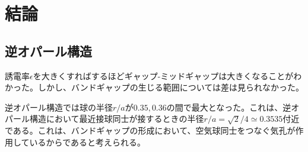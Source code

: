 \documentclass[platex,dvipdfmx]{jsreport}
\numberwithin{equation}{section}
\begin{document}
\chapter{結論}

\section{逆オパール構造}
誘電率$\epsilon$を大きくすればするほどギャップ-ミッドギャップは大きくなることがわかった。しかし、バンドギャップの生じる範囲については差は見られなかった。

逆オパール構造では球の半径$r / a$が$0.35, 0.36$の間で最大となった。これは、逆オパール構造において最近接球同士が接するときの半径$r / a = \sqrt{2} / 4 \simeq 0.3535$付近である。これは、バンドギャップの形成において、空気球同士をつなぐ気孔が作用しているからであると考えられる。






\end{document}
